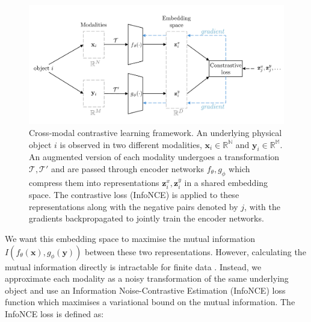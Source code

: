 \documentclass[a4paper,12pt]{article}
\begin{document}
\begin{figure}[H]
    \centering
    \includegraphics[width=\textwidth]{../figures/diagram_contrastive_learning.pdf}
    \caption{Cross-modal contrastive learning framework. An underlying physical object $i$ is observed in two different modalities, $\mathbf{x}_i\in \mathbb{R^N}$ and $\mathbf{y}_i \in \mathbb{R^M}$. An augmented version of each modality undergoes a transformation $\mathcal{T}, \mathcal{T}'$ and are passed through encoder networks $f_{\theta}, g_{\phi}$ which compress them into representations $\mathbf{z}^x_i, \mathbf{z}^y_i$ in a shared embedding space. The contrastive loss (InfoNCE) is applied to these representations along with the negative pairs denoted by $j$, with the gradients backpropagated to jointly train the encoder networks.}
    \label{fig:contrastive_learning}
\end{figure}


We want this embedding space to maximise the mutual information $I(f_{\theta}(\mathbf{x}),g_\phi{(\mathbf{y})})$ between these two representations. However, calculating the mutual information directly is intractable for finite data \cite{mutualinfolimitation}. Instead, we approximate each modality as a noisy transformation of the same underlying object and use an Information Noise-Contrastive Estimation (InfoNCE) loss function \cite{infonce} which maximises a variational bound on the mutual information. The InfoNCE loss is defined as:
\end{document}
